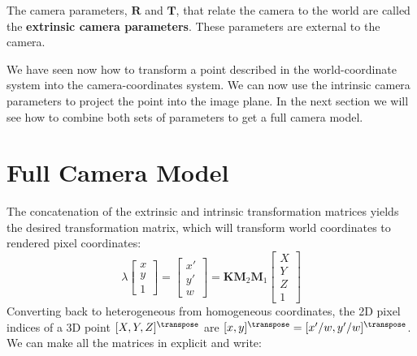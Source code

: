 The camera parameters, $\mathbf{R}$ and $\mathbf{T}$, that relate the camera to the world are called the {\bf extrinsic camera parameters}. These parameters are external to the camera. 

We have seen now how to transform a point described in the world-coordinate system into the camera-coordinates system. We can now use the intrinsic camera parameters to project the point into the image plane. In the next section we will see how to combine both sets of parameters to get a full camera model. 



\section{Full Camera Model}

The concatenation of the extrinsic and intrinsic transformation matrices yields the desired transformation matrix, which will transform world coordinates to rendered pixel coordinates:
\begin{equation}
    \lambda
    \begin{bmatrix}
    x \\
    y \\
    1
    \end{bmatrix}
    =
    \begin{bmatrix}
    x' \\
    y' \\
    w
    \end{bmatrix}
=
\mathbf{K} \mathbf{M}_2 \mathbf{M}_1 
    \begin{bmatrix}
    X \\
    Y \\
    Z \\
    1
    \end{bmatrix}
    \label{eq:combined}
\end{equation}
Converting back to heterogeneous from homogeneous coordinates, the 2D pixel indices of a 3D point $[X, Y, Z]^\transpose$ are $[x,y]^\transpose=[x'/w, y'/w]^\transpose$. 
We can make all the matrices in \eqn{\ref{eq:combined}} explicit and write:
